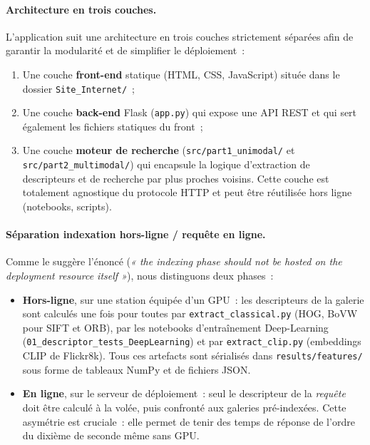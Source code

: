 \documentclass[a4paper,11pt]{article}
\begin{document}
\paragraph{Architecture en trois couches.}
L'application suit une architecture en trois couches strictement séparées
afin de garantir la modularité et de simplifier le déploiement~:
\begin{enumerate}
    \item Une couche \textbf{front-end} statique (HTML, CSS, JavaScript)
    située dans le dossier \texttt{Site\_Internet/}~;
    \item Une couche \textbf{back-end} Flask (\texttt{app.py}) qui
    expose une API REST et qui sert également les fichiers statiques du
    front~;
    \item Une couche \textbf{moteur de recherche} (\texttt{src/part1\_unimodal/}
    et \texttt{src/part2\_multimodal/}) qui encapsule la logique
    d'extraction de descripteurs et de recherche par plus proches
    voisins. Cette couche est totalement agnostique du protocole HTTP
    et peut être réutilisée hors ligne (notebooks, scripts).
\end{enumerate}

\paragraph{Séparation indexation hors-ligne / requête en ligne.}
Comme le suggère l'énoncé (\textit{« the indexing phase should not be
hosted on the deployment resource itself »}), nous distinguons deux
phases~:
\begin{itemize}
    \item \textbf{Hors-ligne}, sur une station équipée d'un GPU~: les
    descripteurs de la galerie sont calculés une fois pour toutes par
    \texttt{extract\_classical.py} (HOG, BoVW pour SIFT et ORB), par les
    notebooks d'entraînement Deep-Learning
    (\texttt{01\_descriptor\_tests\_DeepLearning}) et par
    \texttt{extract\_clip.py} (embeddings CLIP de Flickr8k). Tous ces
    artefacts sont sérialisés dans \texttt{results/features/} sous
    forme de tableaux NumPy et de fichiers JSON.

    \item \textbf{En ligne}, sur le serveur de déploiement~: seul le
    descripteur de la \emph{requête} doit être calculé à la volée, puis
    confronté aux galeries pré-indexées. Cette asymétrie est cruciale~:
    elle permet de tenir des temps de réponse de l'ordre du dixième de
    seconde même sans GPU.
\end{itemize}
\end{document}
